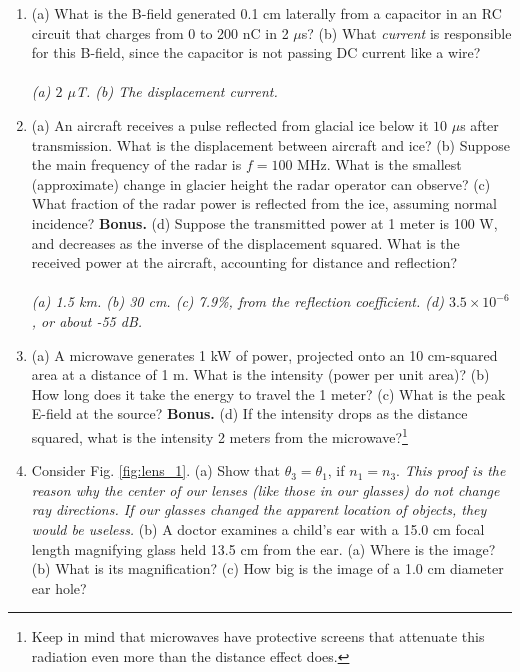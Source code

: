 \documentclass[12pt,twocolumn]{article}
\begin{document}
\noindent
\begin{enumerate}
\item (a) What is the B-field generated 0.1 cm laterally from a capacitor in an RC circuit that charges from 0 to 200 nC in 2 $\mu$s? (b) What \textit{current} is responsible for this B-field, since the capacitor is not passing DC current like a wire? \\ \\
\textit{(a) $2$ $\mu$T. (b) The displacement current.}
\item (a) An aircraft receives a pulse reflected from glacial ice below it $10$ $\mu$s after transmission. What is the displacement between aircraft and ice? (b) Suppose the main frequency of the radar is $f = 100$ MHz.  What is the smallest (approximate) change in glacier height the radar operator can observe? (c) What fraction of the radar power is reflected from the ice, assuming normal incidence? \textbf{Bonus.} (d) Suppose the transmitted power at 1 meter is 100 W, and decreases as the inverse of the displacement squared.  What is the received power at the aircraft, accounting for distance and reflection? \\ \\
\textit{(a) 1.5 km. (b) 30 cm. (c) 7.9\%, from the reflection coefficient. (d) $3.5 \times 10^{-6}$, or about -55 dB.}
\item (a) A microwave generates 1 kW of power, projected onto an 10 cm-squared area at a distance of 1 m.  What is the intensity (power per unit area)? (b) How long does it take the energy to travel the 1 meter? (c) What is the peak E-field at the source?  \textbf{Bonus.} (d) If the intensity drops as the distance squared, what is the intensity 2 meters from the microwave?\footnote{Keep in mind that microwaves have protective screens that attenuate this radiation even more than the distance effect does.}\\ \vspace{3cm}
\item Consider Fig. \ref{fig:lens_1}.  (a) Show that $\theta_3 = \theta_1$, if $n_1 = n_3$.  \textit{This proof is the reason why the center of our lenses (like those in our glasses) do not change ray directions.  If our glasses changed the apparent location of objects, they would be useless.} (b) A doctor examines a child's ear with a 15.0 cm focal length magnifying glass held 13.5 cm from the ear. (a) Where is the image? (b) What is its magnification? (c) How big is the image of a 1.0 cm diameter ear hole? \\ \vspace{3cm}

\end{enumerate}
\end{document}
